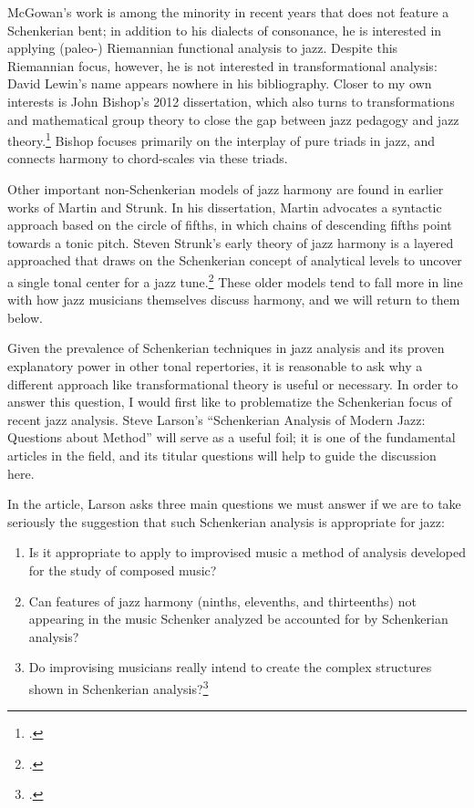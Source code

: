 McGowan’s work is among the minority in recent years that does not feature a
Schenkerian bent; in addition to his dialects of consonance, he is interested
in applying (paleo-) Riemannian functional analysis to jazz. Despite
this Riemannian focus, however, he is not interested in transformational
analysis: David Lewin’s name appears nowhere in his bibliography.
Closer to my own interests is John Bishop’s 2012 dissertation, which also
turns to transformations and mathematical group theory to close the gap
between jazz pedagogy and jazz theory.\footcite{bishop:2012} Bishop focuses
primarily on the interplay of pure triads in jazz, and connects harmony to
chord-scales via these triads.

Other important non-Schenkerian models of jazz harmony are found in earlier
works of Martin and Strunk. In his dissertation, Martin advocates a syntactic
approach based on the circle of fifths, in which chains of descending fifths
point towards a tonic pitch. Steven Strunk’s early theory of jazz
harmony is a layered approached that draws on the Schenkerian concept of
analytical levels to uncover a single tonal center for a jazz
tune.\footcite{strunk:1979} These older models tend to fall more in line with
how jazz musicians themselves discuss harmony, and we will return to them
below.

Given the prevalence of Schenkerian techniques in jazz analysis and its proven
explanatory power in other tonal repertories, it is reasonable to ask why a
different approach like transformational theory is useful or necessary. In
order to answer this question, I would first like to problematize the
Schenkerian focus of recent jazz analysis. Steve Larson’s “Schenkerian
Analysis of Modern Jazz: Questions about Method” will serve as a useful foil;
it is one of the fundamental articles in the field, and its titular questions
will help to guide the discussion here.

In the article, Larson asks three main questions we must answer if we are to
take seriously the suggestion that such Schenkerian analysis is appropriate
for jazz:
\begin{enumerate}
  \singlespacing
  \item Is it appropriate to apply to improvised music a method of analysis
    developed for the study of composed music?
  \item Can features of jazz harmony (ninths, elevenths, and thirteenths) not
    appearing in the music Schenker analyzed be accounted for by Schenkerian
    analysis?
  \item Do improvising musicians really intend to create the complex
    structures shown in Schenkerian analysis?\footcite[210]{larson:1998}
\end{enumerate}

